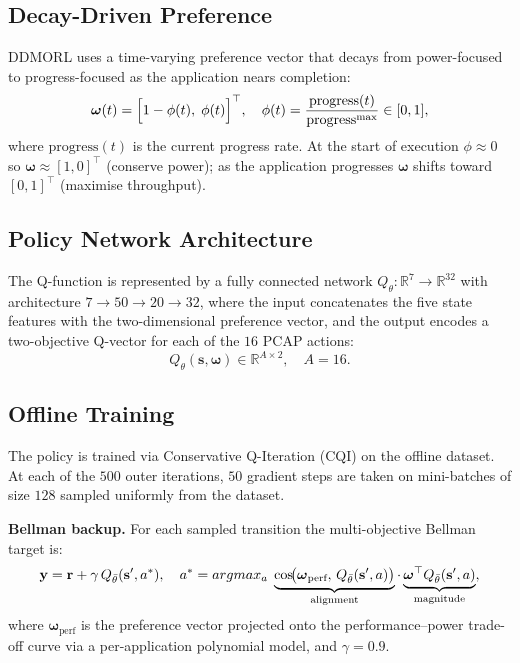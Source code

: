   \subsection{Decay-Driven Preference}
  \label{sec:preference}

  DDMORL uses a time-varying preference vector that decays from power-focused to
  progress-focused as the application nears completion:
  \begin{equation}
      \boldsymbol{\omega}(t) = \Bigl[1 - \phi(t),\; \phi(t)\Bigr]^{\top},
      \quad
      \phi(t) = \frac{\mathrm{progress}(t)}{\mathrm{progress}^{\max}} \in [0, 1],
      \label{eq:preference}
  \end{equation}
  where $\mathrm{progress}(t)$ is the current progress rate. At the start of
  execution $\phi \approx 0$ so $\boldsymbol{\omega} \approx [1, 0]^{\top}$
  (conserve power); as the application progresses $\boldsymbol{\omega}$ shifts
  toward $[0, 1]^{\top}$ (maximise throughput).

  \subsection{Policy Network Architecture}
  \label{sec:network}

  The Q-function is represented by a fully connected network
  $Q_\theta : \mathbb{R}^7 \to \mathbb{R}^{32}$ with architecture
  $7 \to 50 \to 20 \to 32$, where the input concatenates the five state features
  with the two-dimensional preference vector, and the output encodes a
  two-objective Q-vector for each of the $16$ PCAP actions:
  \begin{equation}
      Q_\theta(\mathbf{s}, \boldsymbol{\omega}) \in \mathbb{R}^{A \times 2},
      \quad A = 16.
  \end{equation}

  \subsection{Offline Training}
  \label{ch5:sec:training}

  The policy is trained via Conservative Q-Iteration (CQI) on the offline dataset.
  At each of the $500$ outer iterations, $50$ gradient steps are taken on
  mini-batches of size $128$ sampled uniformly from the dataset.

  \noindent\textbf{Bellman backup.}
  For each sampled transition the multi-objective Bellman target is:
  \begin{equation}
      \mathbf{y} = \mathbf{r} + \gamma\, Q_{\bar\theta}(\mathbf{s}', a^*),
      \quad
      a^* = argmax_{a}\; \underbrace{%
          \cos\!\bigl(\boldsymbol{\omega}_{\text{perf}},\,
                       Q_{\bar\theta}(\mathbf{s}',a)\bigr)}_{\text{alignment}}
      \cdot
      \underbrace{%
          \boldsymbol{\omega}^{\top} Q_{\bar\theta}(\mathbf{s}',a)}_{\text{magnitude}},
      \label{eq:backup}
  \end{equation}
  where $\boldsymbol{\omega}_{\text{perf}}$ is the preference vector projected
  onto the performance--power trade-off curve via a per-application polynomial
  model, and $\gamma = 0.9$.

